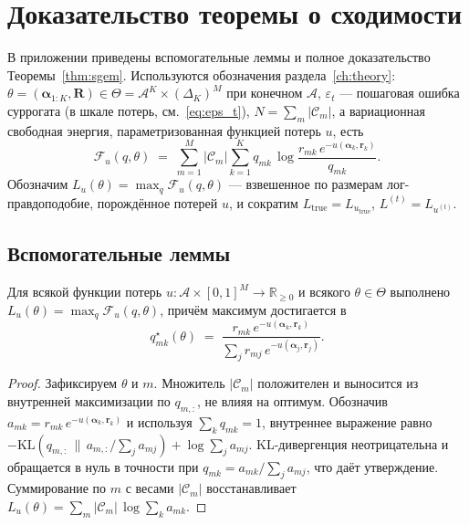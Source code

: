 \chapter{Доказательство теоремы о сходимости}
\label{app:proof}

В приложении приведены вспомогательные леммы и полное доказательство
Теоремы~\ref{thm:sgem}. Используются обозначения
раздела~\ref{ch:theory}: $\theta = (\boldsymbol{\alpha}_{1:K}, \mathbf{R})
\in \Theta = \mathcal{A}^K \times (\Delta_K)^M$ при конечном
$\mathcal{A}$, $\varepsilon_t$ --- пошаговая ошибка суррогата (в шкале
потерь, см.~\eqref{eq:eps_t}), $N = \sum_m |\mathcal{C}_m|$, а
вариационная свободная энергия, параметризованная функцией потерь $u$,
есть
\[
\mathcal{F}_u(q, \theta) \;=\; \sum_{m=1}^{M} |\mathcal{C}_m|
\sum_{k=1}^{K} q_{mk}\, \log \frac{r_{mk}\, e^{-u(\boldsymbol{\alpha}_k, \mathbf{r}_k)}}{q_{mk}}.
\]
Обозначим $L_u(\theta) = \max_q \mathcal{F}_u(q, \theta)$ ---
взвешенное по размерам лог-правдоподобие, порождённое потерей $u$, и
сократим $L_{\mathrm{true}} = L_{u_{\mathrm{true}}}$,
$L^{(t)} = L_{u^{(t)}}$.

\section{Вспомогательные леммы}
\label{app:lemmas}

\begin{proposition}
\label{app:prop-elbo}
Для всякой функции потерь
$u: \mathcal{A} \times [0, 1]^M \to \mathbb{R}_{\geq 0}$ и всякого
$\theta\in\Theta$ выполнено
$L_u(\theta) = \max_{q} \mathcal{F}_u(q, \theta)$, причём максимум
достигается в
\[
q^{\star}_{mk}(\theta) \;=\; \frac{r_{mk}\,e^{-u(\boldsymbol{\alpha}_k, \mathbf{r}_k)}}
{\sum_{j} r_{mj}\,e^{-u(\boldsymbol{\alpha}_j, \mathbf{r}_j)}}.
\]
\end{proposition}

\begin{proof}
Зафиксируем $\theta$ и $m$. Множитель $|\mathcal{C}_m|$ положителен и
выносится из внутренней максимизации по $q_{m,:}$, не влияя на оптимум.
Обозначив $a_{mk} = r_{mk}\, e^{-u(\boldsymbol{\alpha}_k, \mathbf{r}_k)}$
и используя $\sum_k q_{mk} = 1$, внутреннее выражение равно
$-\mathrm{KL}(q_{m,:} \,\|\, a_{m,:}/\!\sum_j a_{mj}) + \log\sum_j a_{mj}$.
KL-дивергенция неотрицательна и обращается в нуль в точности при
$q_{mk} = a_{mk}/\sum_j a_{mj}$, что даёт утверждение. Суммирование по
$m$ с весами $|\mathcal{C}_m|$ восстанавливает
$L_u(\theta) = \sum_m |\mathcal{C}_m|\,\log\sum_k a_{mk}$.
\end{proof}

